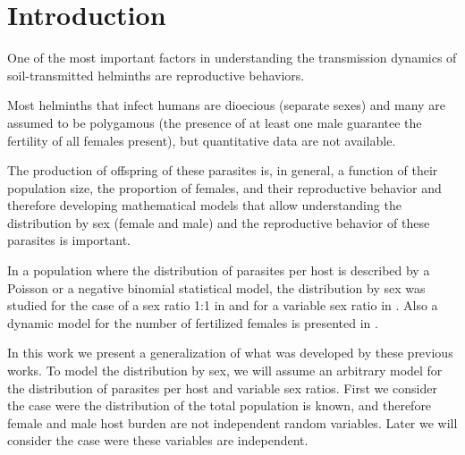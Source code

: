 \documentclass[12pt,a4paper]{article}
\theoremstyle{plain}%
\theoremstyle{definition}
\theoremstyle{remark}
\begin{document}
\tableofcontents
	\section{Introduction}
	One of the most important factors in understanding the transmission dynamics of soil-transmitted helminths are reproductive behaviors.
	
	Most helminths that infect humans are dioecious (separate sexes) and many are assumed to be polygamous (the presence of at least one male guarantee the fertility of all females present), but quantitative data are not available\cite{anderson1992infectious}.
	
	The production of offspring of these parasites is, in general, a function of their population size, the proportion of females, and their reproductive behavior and therefore
	developing mathematical models that allow understanding the distribution by sex (female and male) and the reproductive behavior of these parasites is important.
	

	
	In a population where the distribution of parasites per host is described by a Poisson or a negative binomial statistical model, the distribution by sex was studied for the case of a sex ratio 1:1 in \cite{may1977togetherness} and for a variable sex ratio in \cite{may1993biased}.
	Also a dynamic model for the number of fertilized females is presented in \cite{leyton1968stochastic}.
	
	
	
	In this work we present a generalization of what was developed by these previous works.
	To model the distribution by sex, we will assume an arbitrary model for the distribution of parasites per host and variable sex ratios. 
	First we consider the case were the distribution of the total population is known, and therefore female and male host burden are not independent random variables. Later we will consider the case were these variables are independent. 
	
\end{document}
